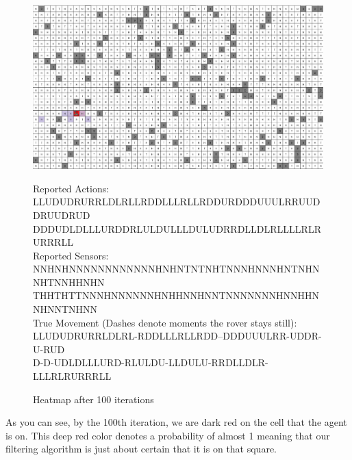 \documentclass{article}
\begin{document}
        \begin{figure}[H]
            \centering
            \includegraphics[scale=0.3]{images/100iter.png}
            \caption{Heatmap after 100 iterations}
            \label{fig:heatmap_100iter}
            \small
            Reported Actions:\\ 
                LLUDUDRURRLDLRLLRDDLLLRLLRDDURDDDUUULRRUUDDRUUDRUD\\
                DDDUDLDLLLURDDRLULDULLLDULUDRRDLLDLRLLLLRLRURRRLL\\
            Reported Sensors:\\
                NNHNHNNNNNNNNNNNNHNHNTNTNHTNNNHNNNHNTNHNNHTNNHHNHN\\
                THHTHTTNNNHNNNNNNHNHHNNHNNTNNNNNNNHNNHHNNHNNTNHNN\\
            True Movement (Dashes denote moments the rover stays still):\\
                LLUDUDRURRLDLRL-RDDLLLRLLRDD--DDDUUULRR-UDDR-U-RUD\\D-D-UDLDLLLURD-RLULDU-LLDULU-RRDLLDLR-LLLRLRURRRLL
        \end{figure}
        As you can see, by the 100th iteration, we are dark red on the cell that the agent is on. This
        deep red color denotes a probability of almost 1 meaning that our filtering algorithm is just 
        about certain that it is on that square.
\end{document}
